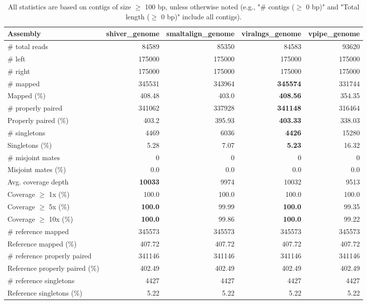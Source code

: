 \documentclass[12pt,a4paper]{article}
\begin{document}
\begin{table}[ht]
\begin{center}
\caption{All statistics are based on contigs of size $\geq$ 100 bp, unless otherwise noted (e.g., "\# contigs ($\geq$ 0 bp)" and "Total length ($\geq$ 0 bp)" include all contigs).}
\begin{tabular}{|l*{4}{|r}|}
\hline
Assembly & shiver\_genome & smaltalign\_genome & viralngs\_genome & vpipe\_genome \\ \hline
\# total reads & 84589 & 85350 & 84583 & 93620 \\ \hline
\# left & 175000 & 175000 & 175000 & 175000 \\ \hline
\# right & 175000 & 175000 & 175000 & 175000 \\ \hline
\# mapped & 345531 & 343964 & {\bf 345574} & 331744 \\ \hline
Mapped (\%) & 408.48 & 403.0 & {\bf 408.56} & 354.35 \\ \hline
\# properly paired & 341062 & 337928 & {\bf 341148} & 316464 \\ \hline
Properly paired (\%) & 403.2 & 395.93 & {\bf 403.33} & 338.03 \\ \hline
\# singletons & 4469 & 6036 & {\bf 4426} & 15280 \\ \hline
Singletons (\%) & 5.28 & 7.07 & {\bf 5.23} & 16.32 \\ \hline
\# misjoint mates & 0 & 0 & 0 & 0 \\ \hline
Misjoint mates (\%) & 0.0 & 0.0 & 0.0 & 0.0 \\ \hline
Avg. coverage depth & {\bf 10033} & 9974 & 10032 & 9513 \\ \hline
Coverage $\geq$ 1x (\%) & 100.0 & 100.0 & 100.0 & 100.0 \\ \hline
Coverage $\geq$ 5x (\%) & {\bf 100.0} & 99.99 & {\bf 100.0} & 99.35 \\ \hline
Coverage $\geq$ 10x (\%) & {\bf 100.0} & 99.86 & {\bf 100.0} & 99.22 \\ \hline
\# reference mapped & 345573 & 345573 & 345573 & 345573 \\ \hline
Reference mapped (\%) & 407.72 & 407.72 & 407.72 & 407.72 \\ \hline
\# reference properly paired & 341146 & 341146 & 341146 & 341146 \\ \hline
Reference properly paired (\%) & 402.49 & 402.49 & 402.49 & 402.49 \\ \hline
\# reference singletons & 4427 & 4427 & 4427 & 4427 \\ \hline
Reference singletons (\%) & 5.22 & 5.22 & 5.22 & 5.22 \\ \hline

\end{tabular}
\end{center}
\end{table}
\end{document}
